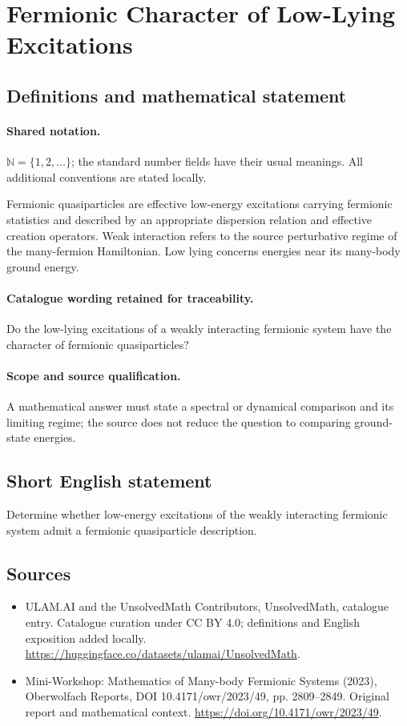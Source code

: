 \documentclass[11pt]{article}
\begin{document}
\section{Fermionic Character of Low-Lying Excitations}\label{statement}

\subsection{Definitions and mathematical statement}

\paragraph{Shared notation.}$\mathbb N=\{1,2,\ldots\}$; the standard number fields have their usual meanings. All additional conventions are stated locally.


Fermionic quasiparticles are effective low-energy excitations carrying fermionic statistics and described by an appropriate dispersion relation and effective creation operators. Weak interaction refers to the source perturbative regime of the many-fermion Hamiltonian. Low lying concerns energies near its many-body ground energy.

\paragraph{Catalogue wording retained for traceability.}
Do the low-lying excitations of a weakly interacting fermionic system have the character of fermionic quasiparticles?

\paragraph{Scope and source qualification.}A mathematical answer must state a spectral or dynamical comparison and its limiting regime; the source does not reduce the question to comparing ground-state energies.
\subsection{Short English statement}
Determine whether low-energy excitations of the weakly interacting fermionic system admit a fermionic quasiparticle description.
\subsection{Sources}
\begin{itemize}
\item[\hypertarget{source:statement:1}{S1}] ULAM.AI and the UnsolvedMath Contributors, UnsolvedMath, catalogue entry. Catalogue curation under CC BY 4.0; definitions and English exposition added locally.
\url{https://huggingface.co/datasets/ulamai/UnsolvedMath}.
\item[\hypertarget{source:statement:2}{S2}] Mini-Workshop: Mathematics of Many-body Fermionic Systems (2023), Oberwolfach Reports, DOI 10.4171/owr/2023/49, pp. 2809--2849. Original report and mathematical context.
\url{https://doi.org/10.4171/owr/2023/49}.
\end{itemize}
\label{end:statement}
\end{document}
